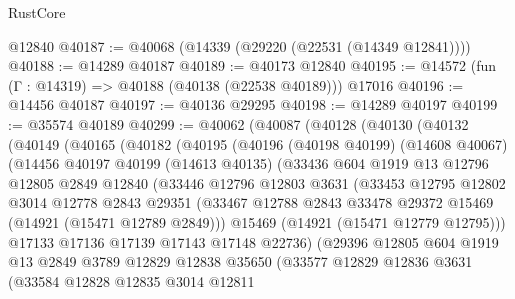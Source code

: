 \begin{lexlean}{RustCore}
\begin{coremodule}
    @12840
@40187 := @40068 (@14339 (@29220 (@22531 (@14349 @12841))))
@40188 := @14289 @40187
@40189 := @40173 @12840
@40195 := @14572 (fun (Γ : @14319) => @40188 (@40138 (@22538 @40189))) @17016
@40196 := @14456 @40187
@40197 := @40136 @29295
@40198 := @14289 @40197
@40199 := @35574 @40189
@40299 := @40062
    (@40087
      (@40128
        (@40130
          (@40132
            (@40149
              (@40165
                (@40182
                  (@40195
                    (@40196
                      (@40198 @40199)
                      (@14608 @40067)
                      (@14456
                        @40197
                        @40199
                        (@14613 @40135)
                        (@33436
                          @604
                          @1919
                          @13
                          @12796
                          @12805
                          @2849
                          @12840
                          (@33446
                            @12796
                            @12803
                            @3631
                            (@33453
                              @12795
                              @12802
                              @3014
                              @12778
                              @2843
                              @29351
                              (@33467
                                @12788
                                @2843
                                @33478
                                @29372
                                @15469
                                (@14921 (@15471 @12789 @2849)))
                              @15469
                              (@14921 (@15471 @12779 @12795)))
                            @17133
                            @17136
                            @17139
                            @17143
                            @17148
                            @22736)
                          (@29396
                            @12805
                            @604
                            @1919
                            @13
                            @2849
                            @3789
                            @12829
                            @12838
                            @35650
                            (@33577
                              @12829
                              @12836
                              @3631
                              (@33584
                                @12828
                                @12835
                                @3014
                                @12811

\end{coremodule}
\end{lexlean}
